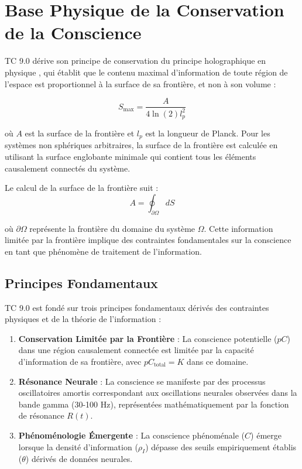\documentclass[12pt]{article}
\begin{document}
\section{Base Physique de la Conservation de la Conscience}

TC 9.0 dérive son principe de conservation du principe holographique en physique \cite{susskind1995,bousso2002}, qui établit que le contenu maximal d'information de toute région de l'espace est proportionnel à la surface de sa frontière, et non à son volume :

\begin{equation}
S_{\text{max}} = \frac{A}{4\ln(2)l_p^2}
\end{equation}

où $A$ est la surface de la frontière et $l_p$ est la longueur de Planck. Pour les systèmes non sphériques arbitraires, la surface de la frontière est calculée en utilisant la surface englobante minimale qui contient tous les éléments causalement connectés du système.

Le calcul de la surface de la frontière suit :
\begin{equation}
A = \oint_{\partial \Omega} dS
\end{equation}

où $\partial \Omega$ représente la frontière du domaine du système $\Omega$. Cette information limitée par la frontière implique des contraintes fondamentales sur la conscience en tant que phénomène de traitement de l'information.

\subsection{Principes Fondamentaux}
TC 9.0 est fondé sur trois principes fondamentaux dérivés des contraintes physiques et de la théorie de l'information :

\begin{enumerate}
    \item \textbf{Conservation Limitée par la Frontière} : La conscience potentielle ($pC$) dans une région causalement connectée est limitée par la capacité d'information de sa frontière, avec $pC_{\text{total}} = K$ dans ce domaine.
    
    \item \textbf{Résonance Neurale} : La conscience se manifeste par des processus oscillatoires amortis correspondant aux oscillations neurales observées dans la bande gamma (30-100 Hz), représentées mathématiquement par la fonction de résonance $R(t)$.
    
    \item \textbf{Phénoménologie Émergente} : La conscience phénoménale ($C$) émerge lorsque la densité d'information ($\rho_I$) dépasse des seuils empiriquement établis ($\theta$) dérivés de données neurales.
\end{enumerate}
\end{document}
